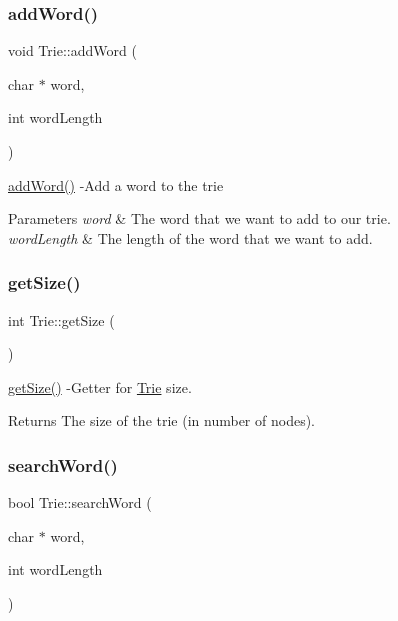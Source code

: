 \subsubsection{\texorpdfstring{add\+Word()}{addWord()}}
{\footnotesize\ttfamily void Trie\+::add\+Word (\begin{DoxyParamCaption}\item[{char $\ast$}]{word,  }\item[{int}]{word\+Length }\end{DoxyParamCaption})}

\hyperlink{class_trie_ad793716c7d7e99240d6b3fa5fd1a4ff8}{add\+Word()} -\/\+Add a word to the trie 
\begin{DoxyParams}{Parameters}
{\em word} & The word that we want to add to our trie. \\
\hline
{\em word\+Length} & The length of the word that we want to add. \\
\hline
\end{DoxyParams}
\mbox{\label{class_trie_aaf9bd72bfad7fa2ecfe47b7a69c05c51}} 
\subsubsection{\texorpdfstring{get\+Size()}{getSize()}}
{\footnotesize\ttfamily int Trie\+::get\+Size (\begin{DoxyParamCaption}{ }\end{DoxyParamCaption})}

\hyperlink{class_trie_aaf9bd72bfad7fa2ecfe47b7a69c05c51}{get\+Size()} -\/\+Getter for \hyperlink{class_trie}{Trie} size. \begin{DoxyReturn}{Returns}
The size of the trie (in number of nodes). 
\end{DoxyReturn}
\mbox{\label{class_trie_a3760a51720b288a6628360008977de6f}} 
\subsubsection{\texorpdfstring{search\+Word()}{searchWord()}}
{\footnotesize\ttfamily bool Trie\+::search\+Word (\begin{DoxyParamCaption}\item[{char $\ast$}]{word,  }\item[{int}]{word\+Length }\end{DoxyParamCaption})}

